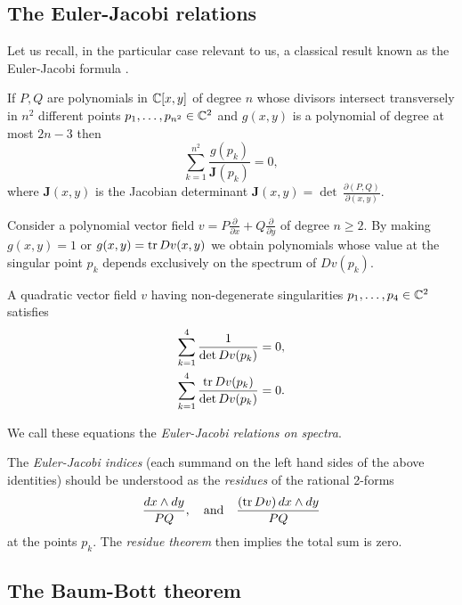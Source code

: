 \documentclass[phd,tocprelim]{cornell}
\begin{document}
\subsection{The Euler-Jacobi relations}

Let us recall, in the particular case relevant to us, a classical result known as the Euler-Jacobi formula \cite[Chpt.~5, Sec.~2]{GriffithsHarris1994}.

\begin{theorem}\label{thm:EJformula}
If $P,Q$ are polynomials in $\mathbb{C}[x,y]$ of degree $n$ whose divisors intersect transversely in $n^2$ different points $p_1,\ldots,p_{n^2}\in\mathbb{C}^2$ and $g(x,y)$ is a polynomial of degree at most $2n-3$ then
\[ \sum_{k=1}^{n^2} \frac{g(p_k)}{\mathbf{J}(p_k)}=0, \]
where $\mathbf{J}(x,y)$ is the Jacobian determinant $\mathbf{J}(x,y)=\operatorname{det}\,\displaystyle\frac{\partial(P,Q)}{\partial(x,y)}$.
\end{theorem}

Consider a polynomial vector field $v=P\frac{\partial}{\partial x}+Q\frac{\partial}{\partial y}$ of degree $n\geq2$. By making $g(x,y)=1$ or $g(x,y)=\operatorname{tr}{Dv(x,y)}$ we obtain polynomials whose value at the singular point $p_k$ depends exclusively on the spectrum of $Dv(p_k)$.

\begin{corollary}\label{coro:EJrelations}
A quadratic vector field $v$ having non-degenerate singularities $p_1,\ldots,p_{4}\in\mathbb{C}^2$ satisfies
\begin{align}
 \sum_{k=1}^{4}\frac{1}{\det{Dv(p_k)}}=0, \label{eq:EJ1}\\
 \sum_{k=1}^{4}\frac{\operatorname{tr}{Dv(p_k)}}{\det{Dv(p_k)}}=0. \label{eq:EJ2}
\end{align}
\end{corollary}
\noindent We call these equations the \emph{Euler-Jacobi relations on spectra}.

\begin{remark}
 The \textit{Euler-Jacobi indices} (each summand on the left hand sides of the above identities) should be understood as the \textit{residues} of the rational 2-forms
  \[ \frac{dx\wedge dy}{PQ}, \quad \text{and} \quad \frac{(\operatorname{tr} Dv)\,dx\wedge dy}{PQ} \]
 at the points $p_k$. The \textit{residue theorem} \cite[Chpt.~5, Sec.~1]{GriffithsHarris1994} then implies the total sum is zero.
\end{remark}



\subsection{The Baum-Bott theorem}
\end{document}

